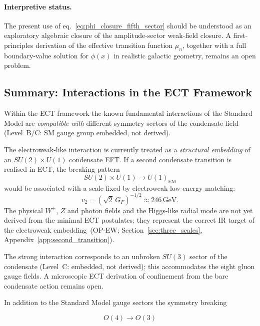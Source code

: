 \documentclass[11pt,a4paper]{article}
\numberwithin{equation}{section}
\begin{document}
\paragraph{Interpretive status.}
The present use of
eq.~\eqref{eq:phi_closure_fifth_sector}
should be understood as an exploratory algebraic closure of the
amplitude-sector weak-field closure.
A first-principles derivation of the effective transition function
$\mu_n$, together with a full boundary-value solution for $\phi(x)$ in
realistic galactic geometry, remains an open problem.


\subsection{Summary: Interactions in the ECT Framework}

Within the ECT framework the known fundamental interactions of the
Standard Model are \emph{compatible with} different symmetry sectors
of the condensate field (Level~B/C: SM gauge group embedded, not derived).

The electroweak-like interaction is currently treated as a
\emph{structural embedding} of an $SU(2)\times U(1)$ condensate EFT.
If a second condensate transition is realised in ECT, the breaking pattern
\begin{equation}
SU(2)\times U(1)\rightarrow U(1)_{\mathrm{EM}}
\end{equation}
would be associated with a scale fixed by electroweak low-energy matching:
\begin{equation}
v_2 = \left(\sqrt{2}\,G_F\right)^{-1/2} \approx 246\,\mathrm{GeV}.
\end{equation}
The physical $W^\pm$, $Z$ and photon fields and the Higgs-like radial mode
are not yet derived from the minimal ECT postulates; they represent the
correct IR target of the electroweak embedding~(OP-EW;
Section~\ref{sec:three_scales}, Appendix~\ref{app:second_transition}).

The strong interaction corresponds to an unbroken $SU(3)$ sector of the
condensate (Level~C: embedded, not derived); this accommodates the
eight gluon gauge fields.  A microscopic ECT derivation of confinement
from the bare condensate action remains open.

In addition to the Standard Model gauge sectors the symmetry breaking

\begin{equation}
O(4)\rightarrow O(3)
\end{equation}
\end{document}
